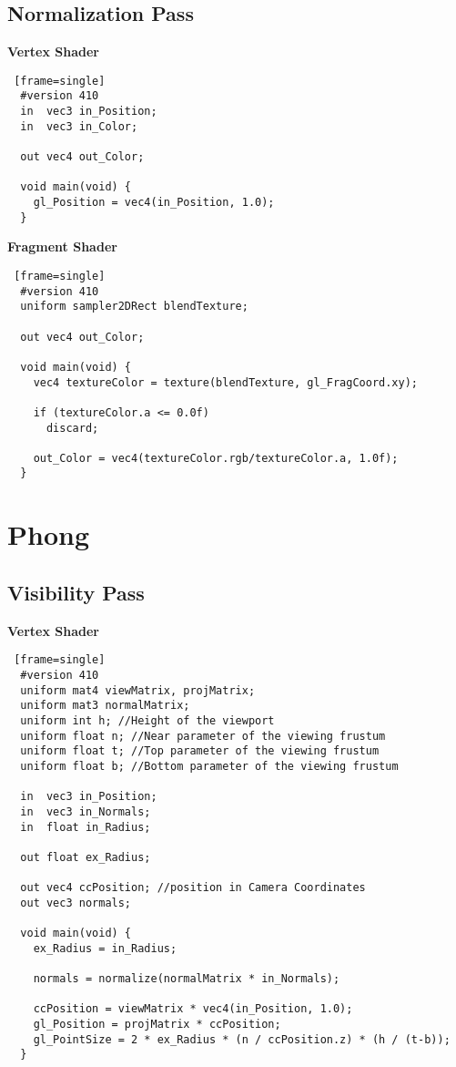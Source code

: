 \subsection{Normalization Pass}
\textbf{Vertex Shader}
\begin{lstlisting} [frame=single]
  #version 410
  in  vec3 in_Position;
  in  vec3 in_Color;

  out vec4 out_Color;

  void main(void) {
    gl_Position = vec4(in_Position, 1.0);
  }
\end{lstlisting}

\textbf{Fragment Shader}
\begin{lstlisting} [frame=single]
  #version 410
  uniform sampler2DRect blendTexture;

  out vec4 out_Color;

  void main(void) {
    vec4 textureColor = texture(blendTexture, gl_FragCoord.xy);

    if (textureColor.a <= 0.0f)
      discard;

    out_Color = vec4(textureColor.rgb/textureColor.a, 1.0f);
  }
\end{lstlisting}
\newpage

\section{Phong \label{phong}}
\subsection{Visibility Pass}
\textbf{Vertex Shader}
\begin{lstlisting} [frame=single]
  #version 410
  uniform mat4 viewMatrix, projMatrix;
  uniform mat3 normalMatrix;
  uniform int h; //Height of the viewport
  uniform float n; //Near parameter of the viewing frustum
  uniform float t; //Top parameter of the viewing frustum
  uniform float b; //Bottom parameter of the viewing frustum

  in  vec3 in_Position;
  in  vec3 in_Normals;
  in  float in_Radius;

  out float ex_Radius;

  out vec4 ccPosition; //position in Camera Coordinates
  out vec3 normals;

  void main(void) {
    ex_Radius = in_Radius;

    normals = normalize(normalMatrix * in_Normals);

    ccPosition = viewMatrix * vec4(in_Position, 1.0);
    gl_Position = projMatrix * ccPosition;
    gl_PointSize = 2 * ex_Radius * (n / ccPosition.z) * (h / (t-b));
  }
\end{lstlisting}
\newpage

